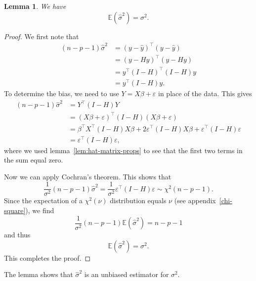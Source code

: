 \documentclass[
  a4paper,
]{article}
\newtheorem{lemma}{Lemma}[section]
\theoremstyle{definition}
\theoremstyle{definition}
\theoremstyle{definition}
\theoremstyle{definition}
\theoremstyle{remark}
\begin{document}
\begin{lemma}
\protect\hypertarget{lem:sigma-hat-unbiased}{}\label{lem:sigma-hat-unbiased}We have
\begin{equation*}
  \mathbb{E}(\hat\sigma^2) = \sigma^2.
\end{equation*}
\end{lemma}

\begin{proof}
We first note that
\begin{align*}
  (n - p - 1) \hat\sigma^2
  &= (y - \hat y)^\top (y - \hat y) \\
  &= (y - H y)^\top (y - H y) \\
  &= y^\top (I - H)^\top (I - H) y \\
  &= y^\top (I - H) y.
\end{align*}
To determine the bias, we need to use \(Y = X\beta + \varepsilon\) in place of the
data. This gives
\begin{align*}
  (n - p - 1) \hat\sigma^2
  &= Y^\top (I-H) Y \\
  &= (X\beta + \varepsilon)^\top (I-H) (X\beta + \varepsilon) \\
  &= \beta^\top X^\top (I-H) X \beta
      + 2 \varepsilon^\top (I-H) X \beta
      + \varepsilon^\top (I-H) \varepsilon\\
  &= \varepsilon^\top (I-H) \varepsilon,
\end{align*}
where we used lemma~\ref{lem:hat-matrix-props} to see that the first two terms in
the sum equal zero.

Now we can apply Cochran's theorem. This shows that
\begin{equation}
  \frac{1}{\sigma^2} (n - p - 1) \hat\sigma^2
  = \frac{1}{\sigma^2} \varepsilon^\top (I-H) \varepsilon
  \sim \chi^2(n - p - 1).  \label{eq:sigma-hat-chi-squared}
\end{equation}
Since the expectation of a \(\chi^2(\nu)\) distribution equals \(\nu\)
(see appendix~\ref{chi-square}), we find
\begin{equation*}
  \frac{1}{\sigma^2} (n - p - 1) \mathbb{E}(\hat\sigma^2)
  = n - p - 1
\end{equation*}
and thus
\begin{equation*}
  \mathbb{E}(\hat\sigma^2)
  = \sigma^2.
\end{equation*}
This completes the proof.
\end{proof}

The lemma shows that \(\hat\sigma^2\) is an unbiased estimator for \(\sigma^2\).
\end{document}
